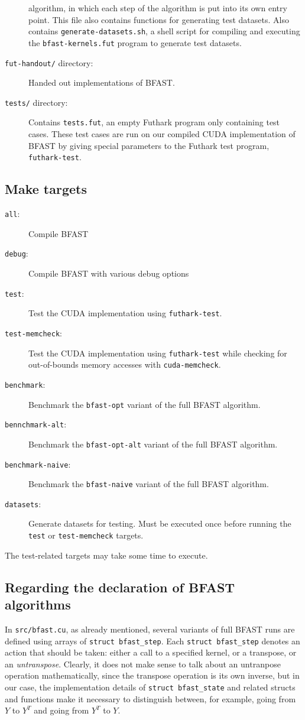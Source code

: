 \begin{description}
  algorithm, in which each step of the algorithm is put into its own entry
  point.
  This file also contains functions for generating test datasets.
  Also contains \texttt{generate-datasets.sh}, a shell script for compiling and
  executing the \texttt{bfast-kernels.fut} program to generate test datasets.
\item[\texttt{fut-handout/} directory:]
  Handed out implementations of BFAST.
\item[\texttt{tests/} directory:]
  Contains \texttt{tests.fut}, an empty Futhark program only containing test
  cases.
  These test cases are run on our compiled CUDA implementation of BFAST by
  giving special parameters to the Futhark test program, \texttt{futhark-test}.
\end{description}

\subsection{Make targets}
\begin{description}
\item[\texttt{all}:] Compile BFAST
\item[\texttt{debug}:] Compile BFAST with various debug options
\item[\texttt{test}:] Test the CUDA implementation using \texttt{futhark-test}.
\item[\texttt{test-memcheck}:]
Test the CUDA implementation using \texttt{futhark-test} while checking for
out-of-bounds memory accesses with \texttt{cuda-memcheck}.
\item[\texttt{benchmark}:]
Benchmark the \texttt{bfast-opt} variant of the full BFAST algorithm.
\item[\texttt{bennchmark-alt}:]
Benchmark the \texttt{bfast-opt-alt} variant of the full BFAST algorithm.
\item[\texttt{benchmark-naive}:]
Benchmark the \texttt{bfast-naive} variant of the full BFAST algorithm.
\item[\texttt{datasets}:]
Generate datasets for testing.
Must be executed once before running the \texttt{test} or
\texttt{test-memcheck} targets.
\end{description}
The test-related targets may take some time to execute.


\subsection{Regarding the declaration of BFAST algorithms}
In \texttt{src/bfast.cu}, as already mentioned, several variants of full BFAST
runs are defined using arrays of \texttt{struct bfast\_step}.
Each \texttt{struct bfast\_step} denotes an action that should be taken: either
a call to a specified kernel, or a transpose, or an \textit{untranspose}.
Clearly, it does not make sense to talk about an untranpose operation
mathematically, since the transpose operation is its own inverse, but in our
case, the implementation details of \texttt{struct bfast\_state} and related
structs and functions make it necessary to distinguish between, for example,
going from \(Y\) to \(Y^T\) and going from \(Y^T\) to \(Y\).


